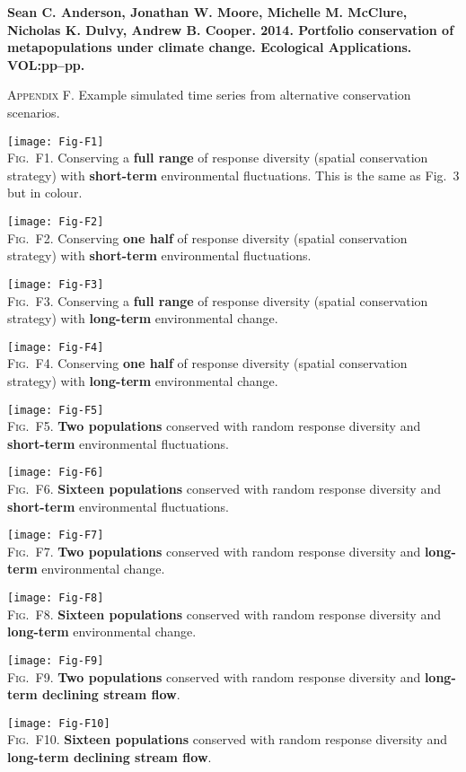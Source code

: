 \documentclass[12pt]{article}
\begin{document}
\textbf{Sean C. Anderson, Jonathan W. Moore, Michelle M. McClure, Nicholas K. Dulvy, Andrew B. Cooper. 2014. Portfolio conservation of metapopulations under climate change. Ecological Applications. VOL:pp--pp.}

\bigskip

\textsc{Appendix F.} Example simulated time series from alternative conservation scenarios.

\bigskip

\clearpage

\texttt{[image: Fig-F1]}\\
\textsc{Fig.~F1.} Conserving a \textbf{full range} of response diversity (spatial conservation strategy) with \textbf{short-term} environmental fluctuations. This is the same as Fig.~3 but in colour.
\clearpage

\texttt{[image: Fig-F2]}\\
\textsc{Fig.~F2.} Conserving \textbf{one half} of response diversity (spatial conservation strategy) with \textbf{short-term} environmental fluctuations.
\clearpage

\texttt{[image: Fig-F3]}\\
\textsc{Fig.~F3.} Conserving a \textbf{full range} of response diversity (spatial conservation strategy) with \textbf{long-term} environmental change.
\clearpage

\texttt{[image: Fig-F4]}\\
\textsc{Fig.~F4.} Conserving \textbf{one half} of response diversity (spatial conservation strategy) with \textbf{long-term} environmental change.
\clearpage

\texttt{[image: Fig-F5]}\\
\textsc{Fig.~F5.} \textbf{Two populations} conserved with random response diversity and \textbf{short-term} environmental fluctuations.
\clearpage

\texttt{[image: Fig-F6]}\\
\textsc{Fig.~F6.} \textbf{Sixteen populations} conserved with random response diversity and \textbf{short-term} environmental fluctuations.
\clearpage

\texttt{[image: Fig-F7]}\\
\textsc{Fig.~F7.} \textbf{Two populations} conserved with random response diversity and \textbf{long-term} environmental change.
\clearpage

\texttt{[image: Fig-F8]}\\
\textsc{Fig.~F8.} \textbf{Sixteen populations} conserved with random response diversity and \textbf{long-term} environmental change.
\clearpage

\texttt{[image: Fig-F9]}\\
\textsc{Fig.~F9.} \textbf{Two populations} conserved with random response diversity and \textbf{long-term declining stream flow}.
\clearpage

\texttt{[image: Fig-F10]}\\
\textsc{Fig.~F10.} \textbf{Sixteen populations} conserved with random response diversity and \textbf{long-term declining stream flow}.
\end{document}
